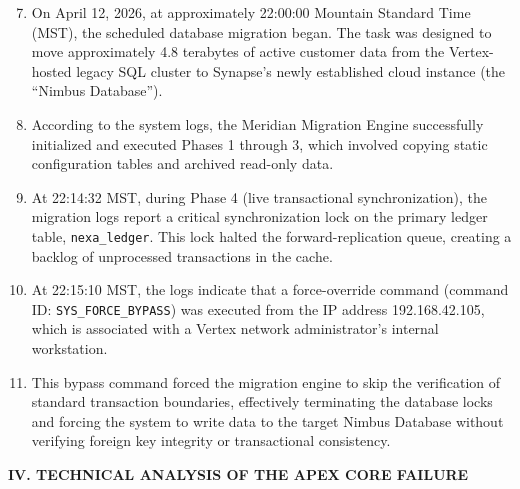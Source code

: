 \documentclass[12pt,letterpaper]{article}
\begin{document}
\begin{enumerate}[label=\arabic*., leftmargin=0.4in, rightmargin=0.1in, align=left]
  \setcounter{enumi}{6}
  \item On April 12, 2026, at approximately 22:00:00 Mountain Standard Time (MST), the scheduled database migration began. The task was designed to move approximately 4.8 terabytes of active customer data from the Vertex-hosted legacy SQL cluster to Synapse's newly established cloud instance (the ``Nimbus Database'').
  
  \item According to the system logs, the Meridian Migration Engine successfully initialized and executed Phases 1 through 3, which involved copying static configuration tables and archived read-only data.
  
  \item At 22:14:32 MST, during Phase 4 (live transactional synchronization), the migration logs report a critical synchronization lock on the primary ledger table, \texttt{nexa\_ledger}. This lock halted the forward-replication queue, creating a backlog of unprocessed transactions in the cache.
  
  \item At 22:15:10 MST, the logs indicate that a force-override command (command ID: \texttt{SYS\_FORCE\_BYPASS}) was executed from the IP address 192.168.42.105, which is associated with a Vertex network administrator's internal workstation.
  
  \item This bypass command forced the migration engine to skip the verification of standard transaction boundaries, effectively terminating the database locks and forcing the system to write data to the target Nimbus Database without verifying foreign key integrity or transactional consistency.
\end{enumerate}

\par\vspace{1.0em}

\begin{center}
  \textbf{\textcolor{LegalNavy}{\MakeUppercase{IV. Technical Analysis of the Apex Core Failure}}}
\end{center}
\par\vspace{0.3em}
\end{document}
